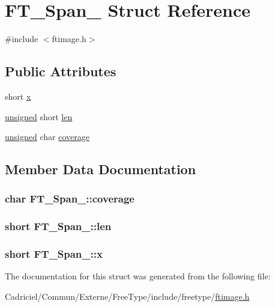 \hypertarget{struct_f_t___span__}{\section{F\-T\-\_\-\-Span\-\_\- Struct Reference}
\label{struct_f_t___span__}
}


{\ttfamily \#include $<$ftimage.\-h$>$}

\subsection*{Public Attributes}
\begin{DoxyCompactItemize}
\item 
short \hyperlink{struct_f_t___span___a7f7235a404c66398b49c50fa09691ba5}{x}
\item 
\hyperlink{_free_image_8h_a425076c7067a1b5166e2cc530e914814}{unsigned} short \hyperlink{struct_f_t___span___a939c84317f25a97d0ba01704591a4d38}{len}
\item 
\hyperlink{_free_image_8h_a425076c7067a1b5166e2cc530e914814}{unsigned} char \hyperlink{struct_f_t___span___a70f9c9e0e8d3f0b38adee03a508ae214}{coverage}
\end{DoxyCompactItemize}


\subsection{Member Data Documentation}
\hypertarget{struct_f_t___span___a70f9c9e0e8d3f0b38adee03a508ae214}{
\subsubsection[{coverage}]{ char F\-T\-\_\-\-Span\-\_\-\-::coverage}}\label{struct_f_t___span___a70f9c9e0e8d3f0b38adee03a508ae214}
\hypertarget{struct_f_t___span___a939c84317f25a97d0ba01704591a4d38}{
\subsubsection[{len}]{ short F\-T\-\_\-\-Span\-\_\-\-::len}}\label{struct_f_t___span___a939c84317f25a97d0ba01704591a4d38}
\hypertarget{struct_f_t___span___a7f7235a404c66398b49c50fa09691ba5}{
\subsubsection[{x}]{\setlength{\rightskip}{0pt plus 5cm}short F\-T\-\_\-\-Span\-\_\-\-::x}}\label{struct_f_t___span___a7f7235a404c66398b49c50fa09691ba5}


The documentation for this struct was generated from the following file\-:\begin{DoxyCompactItemize}
\item 
Cadriciel/\-Commun/\-Externe/\-Free\-Type/include/freetype/\hyperlink{ftimage_8h}{ftimage.\-h}\end{DoxyCompactItemize}
